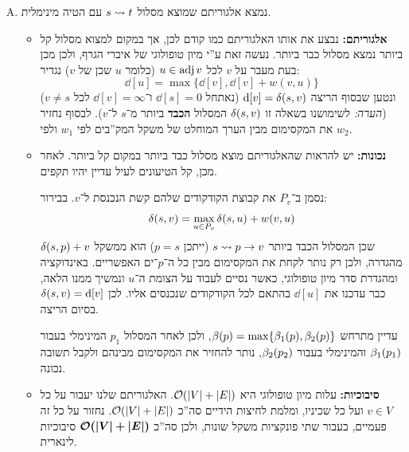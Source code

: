 \documentclass[]{../../../../tex/classes/homework}
\begin{document}
\begin{enumerate}[(A)]
\begin{itemize}
			
			\item \textbf{סיבוכיות: }עלות הגדרת פונקציית המשקל היא $\oc(\sof E)$. עלות הרצת האלגוריתם מההרצאה היא $\oc(\sof E + \sof V)$. סה''כ סיבוכיות לינארית של $\oc(\sof E + \sof V)$ כנדרש. 
		\end{itemize}
		\item נמצא אלגוריתם שמוצא מסלול $s \rightsquigarrow t$ עם הטיה מינימלית. 
		\begin{itemize}
			\item \textbf{אלגוריתם: }נבצע את אותו האלגוריתם כמו קודם לכן, אך במקום למצוא מסלול קל ביותר נמצא מסלול כבר ביותר. נעשה זאת ע''י מיון טופולוגי של איברי הגרף, ולכן מכן בעת מעבר על $v$ לכל $u \in \operatorname{adj} v$ (כלומר $u$ שכן של $v$) נגדיר: 
			\[ \dd[u] = \max\{\dd[v], \dd[v] + w(v, u)\} \]
			ונטען שבסוף הריצה $\mathrm{d}[v] = \delta(s, v)$ (נאתחל $\dd[s] = 0$ ו־$\dd[v] = \infty$ לכל $v \neq s$) (\textit{הערה: }לשימושנו בשאלה זו $\delta(s, v)$ המסלול \textbf{הכבד} ביותר מ־$s$ ל־$v$). לבסוף נחזיר את המקסימום מבין הערך המוחלט של משקל המק''בים לפי $w_1$ ולפי $w_2$. 
			\item \textbf{נכונות: }יש להראות שהאלגוריתם מוצא מסלול כבד ביותר במקום קל ביותר. לאחר מכן, קל הטיעונים לעיל עדיין יהיו תקפים. 
			
			נסמן ב־$P_v$ את קבוצת הקודקודים שלהם קשת הנכנסת ל־$v$. בבירור: 
			\[ \delta(s, v) = \max_{u \in P_v}\delta(s, u) + w(v, u) \]
			שכן המסלול הכבד ביותר $s \rightsquigarrow p \to v$ (ייתכן $p = s$) הוא ממשקל $\delta(s, p) + v$ מהגדרה, ולכן רק נותר לקחת את המקסימום מבין כל ה־$p$־ים האפשריים. באינדוקציה ומהגדרת סדר מיון טופולוגי, כאשר נסיים לעבוד על הצומת ה־$u$ ונמשיך ממנו הלאה, כבר עדכנו את $\dd[u]$ בהתאם לכל הקודקודים שנכנסים אליו. לכן $\delta(s, v) = \mathrm{d}[v]$ בסיום הריצה. 
			
			עדיין מתרחש $\beta(p) = \max\{\beta_1(p), \beta_2(p)\}$, ולכן לאחר המסלול $p_1$ המינימלי בעבור $\beta_1(p_1)$ והמינימלי בעבור $\beta_2(p_2)$, נותר להחזיר את המקסימום מבינהם ולקבל תשובה נכונה. 
			\item \textbf{סיבוכיות: }עלות מיון טופולוגי היא $\mathcal{O}(\left \lvert V \right \rvert + \left \lvert E \right \rvert)$. האלגוריתם שלנו יעבור על כל $v \in V$ ועל כל שכיניו, ומלמת לחיצות הידיים סה''כ $\mathcal{O}(\left \lvert V \right \rvert + \left \lvert E \right \rvert)$. נחזור על כל זה פעמיים, בעבור שתי פונקציות משקל שונות, ולכן סה''כ $\bm{\mathcal{O}(\left \lvert V \right \rvert + \left \lvert E \right \rvert)}$ סיבוכיות לינארית. 
		\end{itemize}
	\end{enumerate}
	
	\npage
\end{document}
